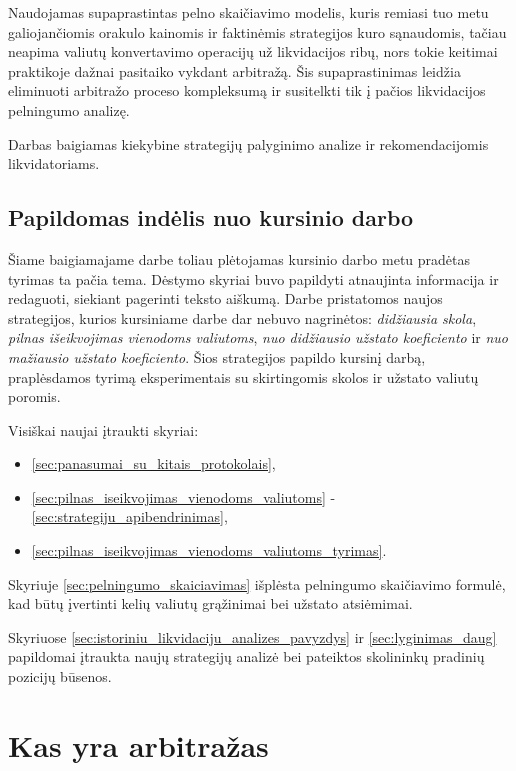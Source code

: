 \documentclass[]{VUMIFTemplateClass}
\begin{document}
Naudojamas supaprastintas pelno skaičiavimo modelis, kuris remiasi tuo metu galiojančiomis orakulo kainomis ir faktinėmis strategijos kuro sąnaudomis, tačiau neapima valiutų konvertavimo operacijų už likvidacijos ribų, nors tokie keitimai praktikoje dažnai pasitaiko vykdant arbitražą. Šis supaprastinimas leidžia eliminuoti arbitražo proceso kompleksumą ir susitelkti tik į pačios likvidacijos pelningumo analizę.

Darbas baigiamas kiekybine strategijų palyginimo analize ir rekomendacijomis likvidatoriams.

\subsection*{Papildomas indėlis nuo kursinio darbo}
Šiame baigiamajame darbe toliau plėtojamas kursinio darbo metu pradėtas tyrimas ta pačia tema. Dėstymo skyriai buvo papildyti atnaujinta informacija ir redaguoti, siekiant pagerinti teksto aiškumą. Darbe pristatomos naujos strategijos, kurios kursiniame darbe dar nebuvo nagrinėtos: \textit{didžiausia skola}, \textit{pilnas išeikvojimas vienodoms valiutoms}, \textit{nuo didžiausio užstato koeficiento} ir \textit{nuo mažiausio užstato koeficiento}. Šios strategijos papildo kursinį darbą, praplėsdamos tyrimą eksperimentais su skirtingomis skolos ir užstato valiutų poromis.

Visiškai naujai įtraukti skyriai:
\begin{itemize}
\item \ref{sec:panasumai_su_kitais_protokolais},
\item \ref{sec:pilnas_iseikvojimas_vienodoms_valiutoms} - \ref{sec:strategiju_apibendrinimas},
\item \ref{sec:pilnas_iseikvojimas_vienodoms_valiutoms_tyrimas}.
\end{itemize}

Skyriuje \ref{sec:pelningumo_skaiciavimas} išplėsta pelningumo skaičiavimo formulė, kad būtų įvertinti kelių valiutų grąžinimai bei užstato atsiėmimai.

Skyriuose \ref{sec:istoriniu_likvidaciju_analizes_pavyzdys} ir \ref{sec:lyginimas_daug} papildomai įtraukta naujų strategijų analizė bei pateiktos skolininkų pradinių pozicijų būsenos.

\section{Kas yra arbitražas}
\end{document}
